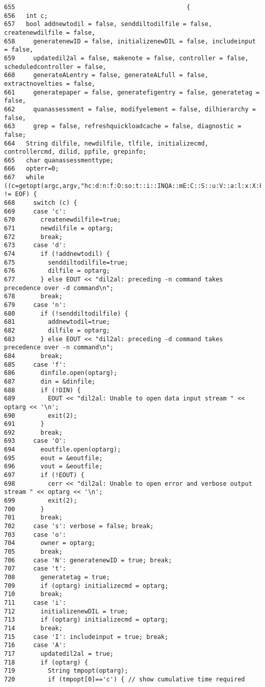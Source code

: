 \footnotesize\begin{verbatim}655                                               {
656   int c;
657   bool addnewtodil = false, senddiltodilfile = false, createnewdilfile = false,
658     generatenewID = false, initializenewDIL = false, includeinput = false,
659     updatedil2al = false, makenote = false, controller = false, scheduledcontroller = false,
660     generateALentry = false, generateALfull = false, extractnovelties = false,
661     generatepaper = false, generatefigentry = false, generatetag = false,
662     quanassessment = false, modifyelement = false, dilhierarchy = false,
663     grep = false, refreshquickloadcache = false, diagnostic = false;
664   String dilfile, newdilfile, tlfile, initializecmd, controllercmd, dilid, ppfile, grepinfo;
665   char quanassessmenttype;
666   opterr=0;
667   while ((c=getopt(argc,argv,"hc:d:n:f:O:so:t::i::INQA::mE:C::S::u:V::a:l:x:X:F:q:p:T:M:H:g:D:")) != EOF) {
668     switch (c) {
669     case 'c':
670       createnewdilfile=true;
671       newdilfile = optarg;
672       break;
673     case 'd':
674       if (!addnewtodil) {
675         senddiltodilfile=true;
676         dilfile = optarg;
677       } else EOUT << "dil2al: preceding -n command takes precedence over -d command\n";
678       break;
679     case 'n':
680       if (!senddiltodilfile) {
681         addnewtodil=true;
682         dilfile = optarg;
683       } else EOUT << "dil2al: preceding -d command takes precedence over -n command\n";
684       break;
685     case 'f':
686       dinfile.open(optarg);
687       din = &dinfile;
688       if (!DIN) {
689         EOUT << "dil2al: Unable to open data input stream " << optarg << '\n';
690         exit(2);
691       }
692       break;
693     case 'O':
694       eoutfile.open(optarg);
695       eout = &eoutfile;
696       vout = &eoutfile;
697       if (!EOUT) {
698         cerr << "dil2al: Unable to open error and verbose output stream " << optarg << '\n';
699         exit(2);
700       }
701       break;
702     case 's': verbose = false; break;
703     case 'o':
704       owner = optarg;
705       break;
706     case 'N': generatenewID = true; break;
707     case 't':
708       generatetag = true;
709       if (optarg) initializecmd = optarg;
710       break;
711     case 'i':
712       initializenewDIL = true;
713       if (optarg) initializecmd = optarg;
714       break;
715     case 'I': includeinput = true; break;
716     case 'A': 
717       updatedil2al = true;
718       if (optarg) {
719         String tmpopt(optarg);
720         if (tmpopt[0]=='c') { // show cumulative time required

\end{verbatim}
